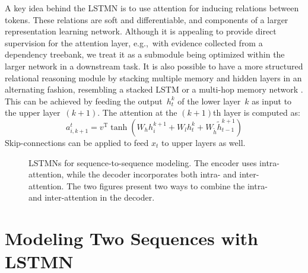 \documentclass[11pt,letterpaper]{article}
\begin{document}
	A key idea behind the LSTMN is to use attention for inducing
        relations between tokens.  These relations are soft and
        differentiable, and components of a larger representation
        learning network. Although it is appealing to provide direct
        supervision for the attention layer, e.g.,~with evidence
        collected from a dependency treebank, we treat it as a
        submodule being optimized within the larger network in a
        downstream task.  It is also possible to have a more
        structured relational reasoning module by stacking multiple
        memory and hidden layers in an alternating fashion, resembling
        a stacked LSTM \cite{graves2013generating} or a multi-hop
        memory network \cite{sukhbaatar2015end}.  This can be achieved
        by feeding the output~${h}_t^k$ of the lower layer~$k$ as
        input to the upper layer~$(k+1)$.  The attention at the
        $(k+1)$th layer is computed as:
        \begin{equation}
        a_{i, k+1}^t = v^\text{T} \tanh(W_h h_{i} ^{k+1} + W_l {h}_t^k + W_{\tilde{h}} \tilde{h}_{t-1} ^ {k+1})
        \label{intraatt2}
        \end{equation}
        Skip-connections \cite{graves2013generating} can be applied to feed
        $x_t$ to upper layers as well.

	\begin{figure*}[t]
		\begin{center}
			\label{shallow} \quad
			\label{deep}
		\end{center}
		\caption{LSTMNs for sequence-to-sequence modeling. The
                  encoder uses intra-attention, while the decoder
                  incorporates both intra- and inter-attention. The
                  two figures present two ways to combine the intra-
                  and inter-attention in the decoder. }
		\label{att}
		\vspace{-2.5ex}
	\end{figure*}
	
	
	

	\section{Modeling Two Sequences with LSTMN}
	\label{sec:lstmns-dual-sequence}
	
\end{document}
